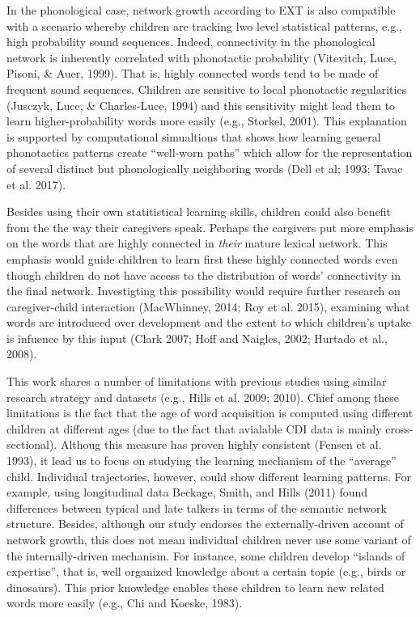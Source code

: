 \documentclass[english,floatsintext,man]{apa6}
\theoremstyle{definition}
\theoremstyle{definition}
\theoremstyle{definition}
\theoremstyle{remark}
\begin{document}
In the phonological case, network growth according to EXT is also
compatible with a scenario whereby children are tracking lwo level
statistical patterns, e.g., high probability sound sequences. Indeed,
connectivity in the phonological network is inherently correlated with
phonotactic probability (Vitevitch, Luce, Pisoni, \& Auer, 1999). That
is, highly connected words tend to be made of frequent sound sequences.
Children are sensitive to local phonotactic regularities (Jusczyk, Luce,
\& Charles-Luce, 1994) and this sensitivity might lead them to learn
higher-probability words more easily (e.g., Storkel, 2001). This
explanation is supported by computational simualtions that shows how
learning general phonotactics patterns create ``well-worn paths'' which
allow for the representation of several distinct but phonologically
neighboring words (Dell et al; 1993; Tavac et al. 2017).

Besides using their own statitistical learning skills, children could
also benefit from the the way their caregivers speak. Perhaps the
cargivers put more emphasis on the words that are highly connected in
\emph{their} mature lexical network. This emphasis would guide children
to learn first these highly connected words even though children do not
have access to the distribution of words' connectivity in the final
network. Investigting this possibility would require further research on
caregiver-child interaction (MacWhinney, 2014; Roy et al. 2015),
examining what words are introduced over development and the extent to
which children's uptake is infuence by this input (Clark 2007; Hoff and
Naigles, 2002; Hurtado et al., 2008).

This work shares a number of limitations with previous studies using
similar research strategy and datasets (e.g., Hills et al. 2009; 2010).
Chief among these limitations is the fact that the age of word
acquisition is computed using different children at different ages (due
to the fact that avialable CDI data is mainly cross-sectional). Althoug
this measure has proven highly consistent (Fensen et al. 1993), it lead
us to focus on studying the learning mechanism of the \enquote{average}
child. Individual trajectories, however, could show different learning
patterns. For example, using longitudinal data Beckage, Smith, and Hills
(2011) found differences between typical and late talkers in terms of
the semantic network structure. Besides, although our study endorses the
externally-driven account of network growth, this does not mean
individual children never use some variant of the internally-driven
mechanism. For instance, some children develop \enquote{islands of
expertise}, that is, well organized knowledge about a certain topic
(e.g., birds or dinosaurs). This prior knowledge enables these children
to learn new related words more easily (e.g., Chi and Koeske, 1983).
\end{document}
